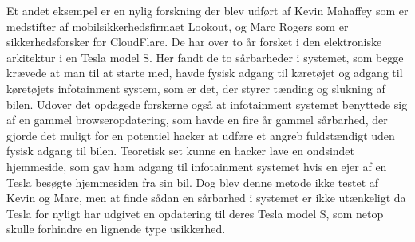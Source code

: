 Et andet eksempel er en nylig forskning der blev udført af Kevin Mahaffey som er medstifter af mobilsikkerhedsfirmaet Lookout, og Marc Rogers som er sikkerhedsforsker for CloudFlare. De har over to år forsket i den elektroniske arkitektur i en Tesla model S. Her fandt de to sårbarheder i systemet, som begge krævede at man til at starte med, havde fysisk adgang til køretøjet og adgang til køretøjets infotainment system, som er det, der styrer tænding og slukning af bilen. Udover det opdagede forskerne også at infotainment systemet benyttede sig af en gammel browseropdatering, som havde en fire år gammel sårbarhed, der gjorde det muligt for en potentiel hacker at udføre et angreb fuldstændigt uden fysisk adgang til bilen. Teoretisk set kunne en hacker lave en ondsindet hjemmeside, som gav ham adgang til infotainment systemet hvis en ejer af en Tesla besøgte hjemmesiden fra sin bil. Dog blev denne metode ikke testet af Kevin og Marc, men at finde sådan en sårbarhed i systemet er ikke utænkeligt da Tesla for nyligt har udgivet en opdatering til deres Tesla model S, som netop skulle forhindre en lignende type usikkerhed.  